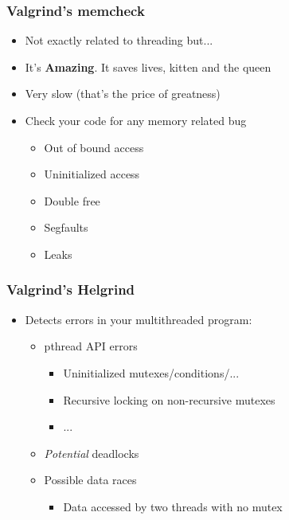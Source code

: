 \begin{frame}
  \frametitle{Valgrind's memcheck}

  \begin{itemize}
  \item Not exactly related to threading but...
  \item It's \textbf{Amazing}. It saves lives, kitten and the queen
  \item Very slow (that's the price of greatness)
  \item Check your code for any memory related bug
    \begin{itemize}
    \item Out of bound access
    \item Uninitialized access
    \item Double free
    \item Segfaults
    \item Leaks
    \end{itemize}
  \end{itemize}
\end{frame}


\begin{frame}
  \frametitle{Valgrind's Helgrind}

  \begin{itemize}
  \item Detects errors in your multithreaded program:
    \begin{itemize}
    \item pthread API errors
      \begin{itemize}
      \item Uninitialized mutexes/conditions/...
      \item Recursive locking on non-recursive mutexes
      \item ...
      \end{itemize}
    \item \emph{Potential} deadlocks
    \item Possible data races
      \begin{itemize}
      \item Data accessed by two threads with no mutex
      \end{itemize}
    \end{itemize}
  \end{itemize}
\end{frame}


